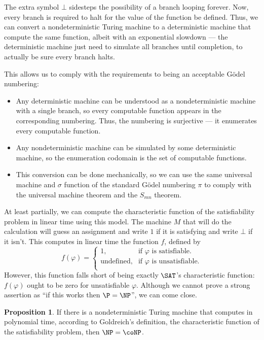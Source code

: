 \documentclass[12pt]{article}
\theoremstyle{definition}
\newtheorem{proposition}[definition]{Proposition}
\begin{document}
The extra symbol $\bot$ sidesteps the possibility of a branch looping forever.
Now,
every branch is required to halt for the value of the function be defined.
Thus,
we can convert a nondeterministic Turing machine to a deterministic machine
that compute the same function,
albeit with an exponential slowdown
--- the deterministic machine just need to simulate all branches until completion,
to actually be sure every branch halts.

This allows us to comply with the requirements to being an acceptable Gödel numbering:
\begin{itemize}
    \item Any deterministic machine can be understood as a nondeterministic machine
        with a single branch,
        so every computable function appears in the corresponding numbering.
        Thus, the numbering is surjective --- it enumerates every computable function.
    \item Any nondeterministic machine can be simulated by some deterministic machine,
        so the enumeration codomain is the set of computable functions.
    \item This conversion can be done mechanically,
        so we can use the same universal machine and $\sigma$ function
        of the standard Gödel numbering $\pi$
        to comply with the universal machine theorem and the $S_{mn}$ theorem.
\end{itemize}

At least partially,
we can compute the characteristic function of the satisfiability problem
in linear time using this model.
The machine $M$ that will do the calculation will guess an assignment
and write $1$ if it is satisfying and write $\bot$ if it isn't.
This computes in linear time the function $f$, defined by
\begin{equation*}
    f(\varphi) = \begin{cases}
        1, & \text{if $\varphi$ is satisfiable.} \\
        \text{undefined}, & \text{if $\varphi$ is unsatisfiable.} \\
    \end{cases}
\end{equation*}
However,
this function falls short of being exactly $\SAT$'s characteristic function:
$f(\varphi)$ ought to be zero for unsatisfiable $\varphi$.
Although we cannot prove a strong assertion as
``if this works then $\P = \NP$'',
we can come close.

\begin{proposition}
    If there is a nondeterministic Turing machine
    that computes in polynomial time, according to Goldreich's definition,
    the characteristic function of the satisfiability problem,
    then $\NP = \coNP$.
\end{proposition}
\end{document}
